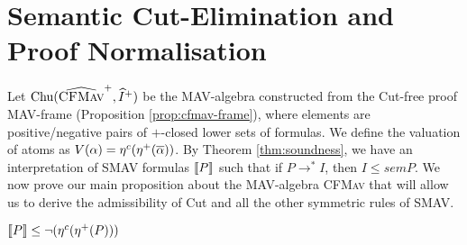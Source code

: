 \section{Semantic Cut-Elimination and Proof Normalisation}
\label{sec:mav-cut-elimination}

\newcommand{\ChuEmbed}{\eta^c}
\newcommand{\ClosedLowerEmbed}{\eta^+}
\newcommand{\LowerEmbed}{\eta}

Let $\mathrm{Chu}(\widehat{\textsc{CFMav}}^+, \mathop{\widehat{I}^+})$ be the
MAV-algebra constructed from the Cut-free proof MAV-frame (Proposition
\ref{prop:cfmav-frame}), where elements are positive/negative pairs of
$+$-closed lower sets of formulas. We define the valuation of atoms as
$V(\alpha) = \ChuEmbed(\ClosedLowerEmbed(\vDual{\alpha}))$. By Theorem
\ref{thm:soundness}, we have an interpretation of SMAV formulas
$\llbracket P \rrbracket$ such that if $P \longrightarrow^* I$, then $I \leq
sem{P}$. We now prove our main proposition about the MAV-algebra
\textsc{CFMav} that will allow us to derive the admissibility of Cut
and all the other symmetric rules of SMAV.

\begin{proposition}\label{prop:embedding-sem}
  $\sem{P} \leq \lnot (\ChuEmbed(\ClosedLowerEmbed(P)))$
\end{proposition}

